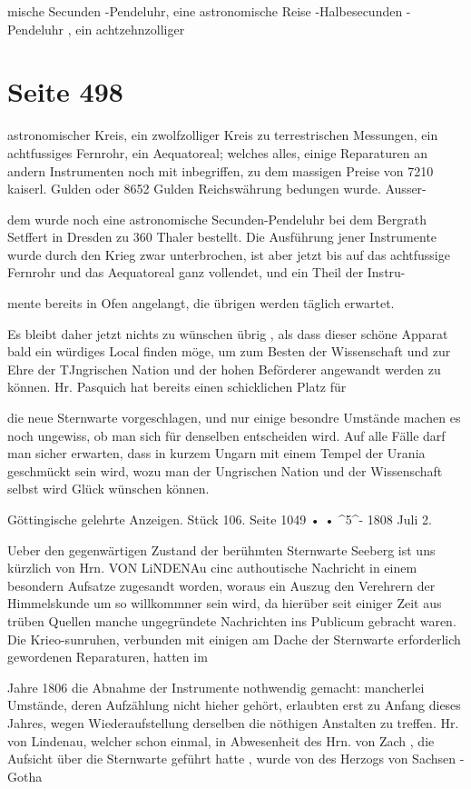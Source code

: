 \documentclass[10pt,a4paper]{article}
\begin{document}
mische Secunden -Pendeluhr, eine astronomische Reise -Halbesecunden -Pendeluhr , ein achtzehnzolliger


\newpage
\section*{Seite 498}
astronomischer Kreis, ein zwolfzolliger Kreis zu terrestrischen Messungen, ein achtfussiges Fernrohr, ein Aequatoreal; welches alles, einige Reparaturen an andern Instrumenten noch mit inbegriffen, zu dem massigen Preise von 7210 kaiserl. Gulden oder 8652 Gulden Reichswährung bedungen wurde. Ausser-

dem wurde noch eine astronomische Secunden-Pendeluhr bei dem Bergrath Setffert in Dresden zu 360 Thaler bestellt. Die Ausführung jener Instrumente wurde durch den Krieg zwar unterbrochen, ist aber jetzt bis auf das achtfussige Fernrohr und das Aequatoreal ganz vollendet, und ein Theil der Instru-

mente bereits in Ofen angelangt, die übrigen werden täglich erwartet.

Es bleibt daher jetzt nichts zu wünschen übrig , als dass dieser schöne Apparat bald ein würdiges Local finden möge, um zum Besten der Wissenschaft und zur Ehre der TJngrischen Nation und der hohen Beförderer angewandt werden zu können. Hr. Pasquich hat bereits einen schicklichen Platz für

die neue Sternwarte vorgeschlagen, und nur einige besondre Umstände machen es noch ungewiss, ob man sich für denselben entscheiden wird. Auf alle Fälle darf man sicher erwarten, dass in kurzem Ungarn mit einem Tempel der Urania geschmückt sein wird, wozu man der Ungrischen Nation und der Wissenschaft selbst wird Glück wünschen können.

Göttingische gelehrte Anzeigen. Stück 106. Seite 1049 • • \textasciicircum{}\textdegree{}5\textasciicircum{}- 1808 Juli 2.

Ueber den gegenwärtigen Zustand der berühmten Sternwarte Seeberg ist uns kürzlich von Hrn. VON LiNDENAu cinc authoutische Nachricht in einem besondern Aufsatze zugesandt worden, woraus ein Auszug den Verehrern der Himmelskunde um so willkommner sein wird, da hierüber seit einiger Zeit aus trüben Quellen manche ungegründete Nachrichten ins Publicum gebracht waren. Die Krieo-sunruhen, verbunden mit einigen am Dache der Sternwarte erforderlich gewordenen Reparaturen, hatten im

Jahre 1806 die Abnahme der Instrumente nothwendig gemacht: mancherlei Umstände, deren Aufzählung nicht hieher gehört, erlaubten erst zu Anfang dieses Jahres, wegen Wiederaufstellung derselben die nöthigen Anstalten zu treffen. Hr. von Lindenau, welcher schon einmal, in Abwesenheit des Hrn. von Zach , die Aufsicht über die Sternwarte geführt hatte , wurde von des Herzogs von Sachsen - Gotha
\end{document}
